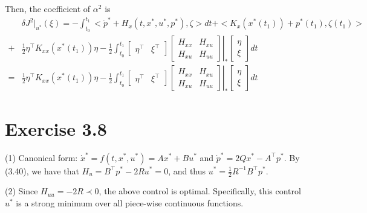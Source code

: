 \documentclass[11pt]{report}
\newcommand{\T}{\intercal}
\begin{document}
Then, the coefficient of $\alpha^2$ is 
\begin{align*}
& \delta J^2|_{u^*}(\xi) = -\int_{t_0}^{t_1} <\dot{p}^* + H_x(t,x^*,u^*,p^*), \zeta> dt + <K_x(x^*(t_1)) + p^*(t_1), \zeta(t_1)> \\+&\frac{1}{2} \eta^\T K_{xx}(x^*(t_1)) \eta - \frac{1}{2}\int_{t_0}^{t_1} \begin{bmatrix}\eta^\T & \xi^\T\end{bmatrix} \left.\begin{bmatrix}H_{xx} & H_{xu}\\H_{xu} & H_{uu}\end{bmatrix}\right|_*\begin{bmatrix}\eta\\ \xi\end{bmatrix} dt\\
=&\frac{1}{2} \eta^\T K_{xx}(x^*(t_1)) \eta - \frac{1}{2}\int_{t_0}^{t_1} \begin{bmatrix}\eta^\T & \xi^\T\end{bmatrix} \left.\begin{bmatrix}H_{xx} & H_{xu}\\H_{xu} & H_{uu}\end{bmatrix}\right|_*\begin{bmatrix}\eta\\ \xi\end{bmatrix} dt
\end{align*}

\section*{Exercise 3.8}
(1) Canonical form: $\dot{x}^* = f(t,x^*,u^*) = Ax^* + Bu^*$ and $\dot{p}^* = 2Qx^* - A^\T p^*$. By (3.40), we have that $H_u = B^\T p^* - 2Ru^* = 0$, and thus $u^* = \frac{1}{2}R^{-1}B^\T p^*$.

\noindent (2) Since $H_{uu} = -2R \prec 0$, the above control is optimal. Specifically, this control $u^*$ is a strong minimum over all piece-wise continuous functions.
\end{document}
